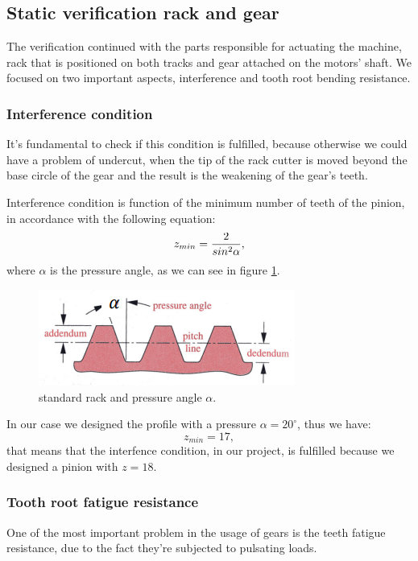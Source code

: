 \subsection{Static verification rack and gear}
The verification continued with the parts responsible for actuating the machine, rack that is positioned on both tracks and gear attached on the motors' shaft.
We focused on two important aspects, interference and tooth root bending resistance.

\subsubsection*{Interference condition}
It's fundamental to check if this condition is fulfilled, because otherwise we could have a problem of undercut, when the tip of the rack cutter is moved beyond the base circle of the gear and the result is the weakening of the gear's teeth.

Interference condition is function of the minimum number of teeth of the pinion, in accordance with the following equation:
\begin{equation}
	\centering
	z_{min} = \frac{2}{sin^2\alpha},
\end{equation}
where $\alpha$ is the pressure angle, as we can see in figure \ref{fig:rack}.
\begin{figure}
	\centering
	\includegraphics[scale=1]{Images/rack.png}
	\caption{standard rack and pressure angle $\alpha$.}
	\label{fig:rack}
\end{figure}
In our case we designed the profile with a pressure $\alpha = 20^\circ$, thus we have:
\begin{equation*}
	z_{min} = 17,
\end{equation*}
that means that the interfence condition, in our project, is fulfilled because we designed a pinion with $z=18$.

\subsubsection*{Tooth root fatigue resistance}
One of the most important problem in the usage of gears is the teeth fatigue resistance, due to the fact they're subjected to pulsating loads.

